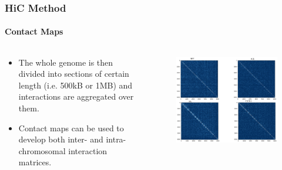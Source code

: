 \documentclass{beamer}
\begin{document}
\begin{frame}
    \frametitle{HiC Method}
    \framesubtitle{Contact Maps}
    \begin{columns}
        \begin{column}{.5\textwidth}
            \begin{itemize}
                \item The whole genome is then divided into sections of certain length (i.e. 500kB or 1MB)
                    and interactions are aggregated over them.
                \item Contact maps can be used to develop both inter- and 
                    intra-chromosomal interaction matrices.

            \end{itemize}
        \end{column}
        \begin{column}{.5\textwidth}
             \begin{figure}[H]
                \centering
                \includegraphics[width=\textwidth]{figures/grand_scheme_of_things.png}
                \caption*{}
            \end{figure}
        \end{column}
    \end{columns}
\end{frame}
\end{document}
